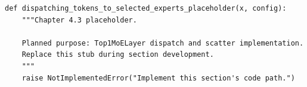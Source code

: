 \begin{lstlisting}[style=bookpython,caption={Planned code placeholder for dispatching tokens to selected experts.},label={lst:ch04-dispatching-tokens-to-selected-experts}]
def dispatching_tokens_to_selected_experts_placeholder(x, config):
    """Chapter 4.3 placeholder.

    Planned purpose: Top1MoELayer dispatch and scatter implementation.
    Replace this stub during section development.
    """
    raise NotImplementedError("Implement this section's code path.")
\end{lstlisting}
